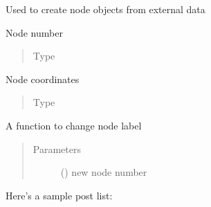\documentclass[letterpaper,10pt,english]{sphinxmanual}
\begin{document}
\begin{fulllineitems}
\label{\detokenize{pyCofea/api:cofea.Node}}
Used to create node objects from external data

\begin{fulllineitems}
\label{\detokenize{pyCofea/api:cofea.Node.label}}
Node number
\begin{quote}\begin{description}
\item[{Type}] \leavevmode
{}

\end{description}\end{quote}

\end{fulllineitems}


\begin{fulllineitems}
\label{\detokenize{pyCofea/api:cofea.Node.coordinates}}
Node coordinates
\begin{quote}\begin{description}
\item[{Type}] \leavevmode
{}

\end{description}\end{quote}

\end{fulllineitems}


\begin{fulllineitems}
\label{\detokenize{pyCofea/api:cofea.Node.changeLabel}}
A function to change node label
\begin{quote}\begin{description}
\item[{Parameters}] \leavevmode
{} () \textendash{} new node number

\end{description}\end{quote}

\end{fulllineitems}


\end{fulllineitems}


Here’s a sample post list:
\begin{itemize}
\end{itemize}







\renewcommand{\indexname}{Index}
\printindex
\end{document}

